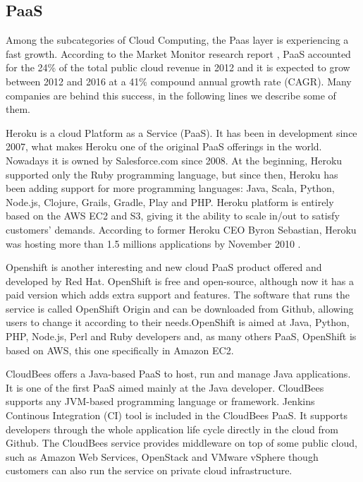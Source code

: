\subsection{PaaS}
Among the subcategories of Cloud Computing, the Paas layer is experiencing a fast growth. According to the Market Monitor research report \cite{aslett2013451}, PaaS accounted for the 24\% of the total public cloud revenue in 2012 and it is expected to grow between 2012 and 2016 at a 41\% compound annual growth rate (CAGR). Many companies are behind this success, in the following lines we describe some of them.
\par
Heroku \cite{heroku} is a cloud Platform as a Service (PaaS). It has been in development since 2007, what makes Heroku one of the original PaaS offerings in the world. Nowadays it is owned by Salesforce.com since 2008. At the beginning, Heroku supported only the Ruby programming language, but since then, Heroku has been adding support for more programming languages: Java, Scala, Python, Node.js, Clojure, Grails, Gradle, Play and PHP. Heroku platform is entirely based on the AWS EC2 and S3, giving it the ability to scale in/out to satisfy customers' demands.
According to former Heroku CEO Byron Sebastian, Heroku was hosting more than 1.5 millions applications by November 2010 \cite{Heroku:gigaom}.
\par
Openshift \cite{OpenShift} is another interesting and new cloud PaaS product offered and developed by Red Hat. OpenShift is free and open-source, although now it has a paid version which adds extra support and features. The software that runs the service is called OpenShift Origin \cite{OpenShiftOrigin} and can be downloaded from Github, allowing users to change it according to their needs.OpenShift is aimed at Java, Python, PHP, Node.js, Perl and Ruby developers and, as many others PaaS, OpenShift is based on AWS, this one specifically in Amazon EC2.
\par
CloudBees \cite{CloudBees}
offers a Java-based PaaS to host, run and manage Java applications. It is one of the first PaaS aimed mainly at the Java developer. CloudBees supports any JVM-based programming language or framework. Jenkins Continous Integration (CI) tool is included in the CloudBees PaaS. It supports developers through the whole application life cycle directly in the cloud from Github. The CloudBees service provides middleware on top of some public cloud, such as Amazon Web Services, OpenStack and VMware vSphere though customers can also run the service on private cloud infrastructure.

